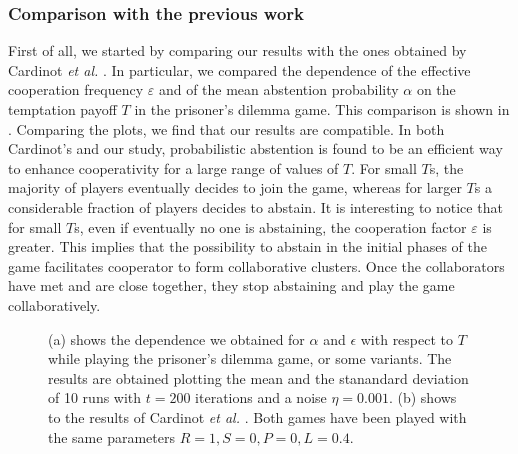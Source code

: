 \documentclass[12pt,oneside,a4paper,fleqn]{article}
\begin{document}
\subsubsection{Comparison with the previous work}
First of all, we started by comparing our results with the ones obtained by Cardinot \emph{et al.} \cite{cardinot2018}. In particular, we compared the dependence of the effective cooperation frequency $\varepsilon$ and of the mean abstention probability $\alpha$ on the temptation payoff $T$ in the prisoner's dilemma game.
This comparison is shown in . Comparing the plots, we find that our results are compatible. In both Cardinot's and our study, probabilistic abstention is found to be an efficient way to enhance cooperativity for a large range of values of $T$. For small $T$s, the majority of players eventually decides to join the game, whereas for larger $T$s a considerable fraction of players decides to abstain. It is interesting to notice that for small $T$s, even if eventually no one is abstaining, the cooperation factor $\varepsilon$ is greater. This implies that the possibility to abstain in the initial phases of the game facilitates cooperator to form collaborative clusters. Once the collaborators have met and are close together, they stop abstaining and play the game collaboratively.
\begin{figure}
    \centering
    \caption{(a) shows the dependence we obtained for $\alpha$ and $\epsilon$ with respect to $T$ while playing the prisoner's dilemma game, or some variants. The results are obtained plotting the mean and the stanandard deviation of 10 runs with $t=200$ iterations and a noise $\eta = 0.001$. (b) shows to the results of Cardinot \emph{et al.}  \cite{cardinot2018}. Both games have been played with the same parameters $R = 1, S = 0, P = 0, L = 0.4$.}
    \label{fig: comparison of epsilon and alpha}
\end{figure}
\end{document}
